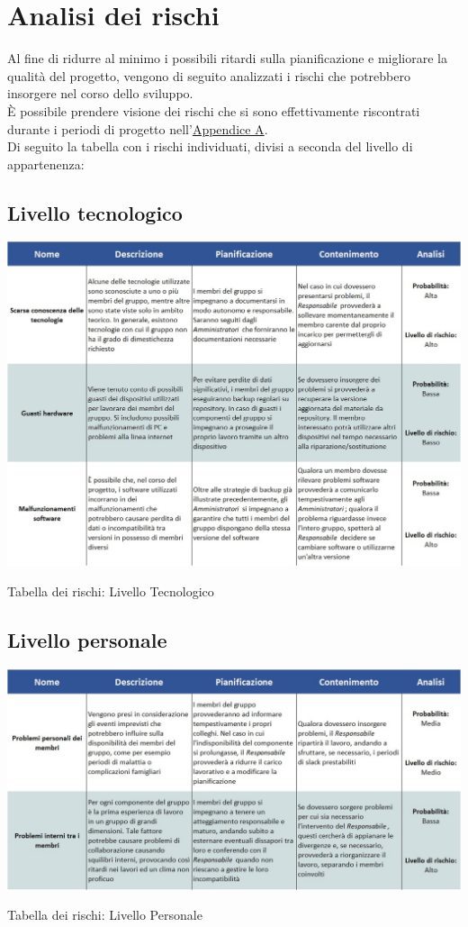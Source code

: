 \newpage

\section{Analisi dei rischi}

Al fine di ridurre al minimo i possibili ritardi sulla pianificazione e migliorare la qualità del progetto, vengono di seguito analizzati i rischi che potrebbero insorgere nel corso dello sviluppo.\\

È possibile prendere visione dei rischi che si sono effettivamente riscontrati durante i periodi di progetto nell'\hyperref[RiscontroRischi]{Appendice A}.\\
Di seguito la tabella con i rischi individuati, divisi a seconda del livello di appartenenza:

\subsection{Livello tecnologico}
\begin{table}[h!]
	\centerline{\includegraphics[scale=0.55]{img/Rischi/LivelloTecnologico.jpg}}
	\caption{Tabella dei rischi: Livello Tecnologico}
\end{table}
\clearpage

\subsection{Livello personale}
\begin{table}[h!]
	\centerline{\includegraphics[scale=0.55]{img/Rischi/LivelloPersonale.jpg}}
	\caption{Tabella dei rischi: Livello Personale}
\end{table}
\clearpage

